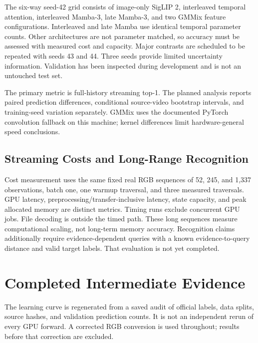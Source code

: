 \documentclass[letterpaper,10pt,conference]{ieeeconf}
\begin{document}
The six-way seed-42 grid consists of image-only SigLIP 2, interleaved
temporal attention, interleaved Mamba-3, late Mamba-3, and two GMMix
feature configurations. Interleaved and late Mamba use identical temporal
parameter counts. Other architectures are not parameter matched, so
accuracy must be assessed with measured cost and capacity. Major contrasts
are scheduled to be repeated with seeds 43 and 44. Three seeds provide limited uncertainty
information. Validation has been inspected during development and is not
an untouched test set.

The primary metric is full-history streaming top-1. The planned analysis reports paired
prediction differences, conditional source-video bootstrap intervals,
and training-seed variation separately. GMMix uses the documented
PyTorch convolution fallback on this machine; kernel differences limit
hardware-general speed conclusions.

\begin{table}[t]
\centering\small
\caption{Planned final-checkpoint comparison. Dashes indicate results
not yet supplied by completed matched runs, not zero accuracy.}

\end{table}

\subsection{Streaming Costs and Long-Range Recognition}
Cost measurement uses the same fixed real RGB sequences of 52, 245, and
1,337 observations, batch one, one warmup traversal, and three measured
traversals. GPU latency, preprocessing/transfer-inclusive latency, state
capacity, and peak allocated memory are distinct metrics. Timing runs
exclude concurrent GPU jobs. File decoding is outside the timed path.
These long sequences measure computational scaling, not long-term memory
accuracy. Recognition claims additionally require evidence-dependent
queries with a known evidence-to-query distance and valid target labels.
That evaluation is not yet completed.

\section{Completed Intermediate Evidence}
\begin{table}[t]
\centering\small
\caption{Intermediate clip validation, one seed and all 24,777 videos.
These checkpoints are not the final comparison checkpoints.}

\end{table}
The learning curve is regenerated from a saved audit of official labels,
data splits, source hashes, and validation prediction counts. It is not
an independent rerun of every GPU forward. A corrected RGB conversion is
used throughout; results before that correction are excluded.
\end{document}
